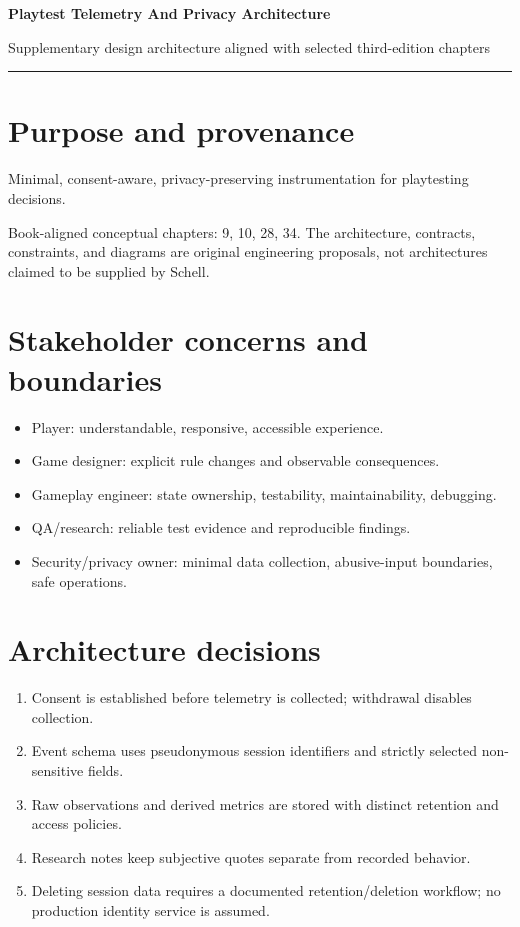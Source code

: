 \documentclass[11pt]{article}
\begin{document}
{\huge\bfseries\color{suiteblue} Playtest Telemetry And Privacy Architecture}\par
\vspace{0.15in}
{\normalsize\color{suitegray} Supplementary design architecture aligned with selected third-edition chapters}\par
\vspace{0.15in}\hrule\vspace{0.15in}

\section{Purpose and provenance}
Minimal, consent-aware, privacy-preserving instrumentation for playtesting decisions.

Book-aligned conceptual chapters: 9, 10, 28, 34. The architecture, contracts, constraints, and diagrams are original engineering proposals, not architectures claimed to be supplied by Schell.


\section{Stakeholder concerns and boundaries}
\begin{itemize}
\item Player: understandable, responsive, accessible experience.
\item Game designer: explicit rule changes and observable consequences.
\item Gameplay engineer: state ownership, testability, maintainability, debugging.
\item QA/research: reliable test evidence and reproducible findings.
\item Security/privacy owner: minimal data collection, abusive-input boundaries, safe operations.
\end{itemize}

\section{Architecture decisions}
\begin{enumerate}
\item Consent is established before telemetry is collected; withdrawal disables collection.
\item Event schema uses pseudonymous session identifiers and strictly selected non-sensitive fields.
\item Raw observations and derived metrics are stored with distinct retention and access policies.
\item Research notes keep subjective quotes separate from recorded behavior.
\item Deleting session data requires a documented retention/deletion workflow; no production identity service is assumed.
\end{enumerate}
\end{document}
